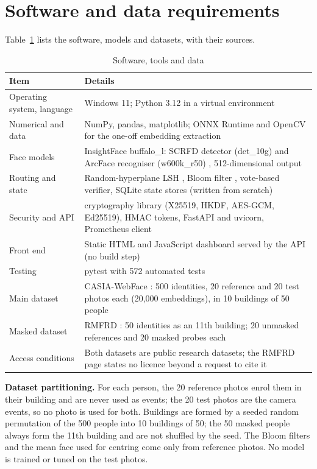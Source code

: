 \documentclass[12pt,a4paper,oneside]{report}
\begin{document}
\section{Software and data requirements}
Table~\ref{tab:software} lists the software, models and datasets, with their sources.

\begin{table}[htbp]
\centering
\caption{Software, tools and data}\label{tab:software}
{\small\setlength{\tabcolsep}{4pt}\renewcommand{\arraystretch}{1.2}
\begin{tabular}{|p{3.59cm}|p{10.99cm}|}\hline
\textbf{Item} & \textbf{Details}\\\hline
Operating system, language & Windows 11; Python 3.12 in a virtual environment\\\hline
Numerical and data & NumPy, pandas, matplotlib; ONNX Runtime and OpenCV for the one-off embedding extraction\\\hline
Face models & InsightFace buffalo\_\allowbreak l: SCRFD detector (det\_\allowbreak 10g) \cite{ref18} and ArcFace recogniser (w600k\_\allowbreak r50) \cite{ref17}, 512-dimensional output\\\hline
Routing and state & Random-hyperplane LSH \cite{ref14}, Bloom filter \cite{ref12}, vote-based verifier, SQLite state stores (written from scratch)\\\hline
Security and API & cryptography library (X25519, HKDF, AES-GCM, Ed25519), HMAC tokens, FastAPI and uvicorn, Prometheus client\\\hline
Front end & Static HTML and JavaScript dashboard served by the API (no build step)\\\hline
Testing & pytest with 572 automated tests\\\hline
Main dataset & CASIA-WebFace \cite{ref19}: 500 identities, 20 reference and 20 test photos each (20,000 embeddings), in 10 buildings of 50 people\\\hline
Masked dataset & RMFRD \cite{ref20}: 50 identities as an 11th building; 20 unmasked references and 20 masked probes each\\\hline
Access conditions & Both datasets are public research datasets; the RMFRD page states no licence beyond a request to cite it\\\hline
\end{tabular}}
\end{table}

\textbf{Dataset partitioning.} For each person, the 20 reference photos enrol them in their building and are never used as events; the 20 test photos are the camera events, so no photo is used for both. Buildings are formed by a seeded random permutation of the 500 people into 10 buildings of 50; the 50 masked people always form the 11th building and are not shuffled by the seed. The Bloom filters and the mean face used for centring come only from reference photos. No model is trained or tuned on the test photos.
\end{document}
